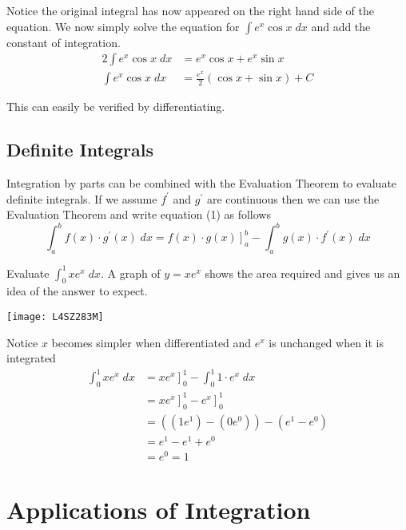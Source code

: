 Notice the original integral has now appeared on the right hand side of the equation. We
now simply solve the equation for $\int e^{x} \cos  x\; d x$ and add the constant of integration.
\begin{align*}2 \int e^{x} \cos  x\; d x &  = e^{x} \cos  x +e^{x} \sin  x \\
\int e^{x} \cos  x\; d x &  = \frac{e^{x}}{2} \left (\cos  x +\sin  x\right ) +C\end{align*}

This can easily be verified by differentiating. 

\subsection*{Definite Integrals}
Integration by parts can be combined with the Evaluation Theorem to evaluate definite integrals. If
we assume $f^{ \prime }$ and $g^{ \prime }$ are continuous then we can use the Evaluation Theorem and write equation (1) as follows
\begin{equation}\int _{a}^{b}f (x) \cdot g^{ \prime } (x)\; d x =\left .f (x) \cdot g (x)\right ]_{a}^{b} -\int _{a}^{b}g (x) \cdot f^{ \prime } (x)\; d x\tag{5}
\end{equation}

\example Evaluate $\int _{0}^{1}x e^{x}\; d x$. A graph of $y =x e^{x}$ shows the area required and gives us an idea of the answer to expect. 
\begin{center}
\texttt{[image: L4SZ283M]}
\end{center}
\solution Notice $x$ becomes simpler when differentiated and $e^{x}$ is unchanged when it is integrated
\begin{align*}\int _{0}^{1}x e^{x}\; d x &  = \left .x e^{x}\right ]_{0}^{1} -\int _{0}^{1}1 \cdot e^{x}\; d x \\
 &  = \left .x e^{x}\right ]_{0}^{1} -\left .e^{x}\right ]_{0}^{1} \\
 &  = \left (\left (1 e^{1}\right ) -\left (0 e^{0}\right )\right ) -\left (e^{1} -e^{0}\right ) \\
 &  = e^{1} -e^{1} +e^{0} \\
 &  = e^{0} =1\end{align*}


\section{Applications of Integration}


